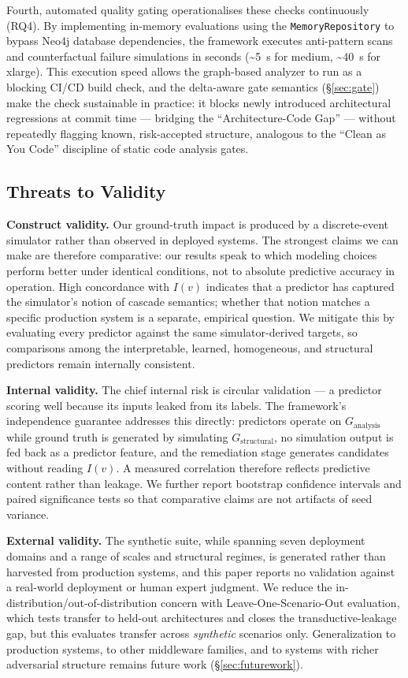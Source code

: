 \documentclass[review]{elsarticle}
\begin{document}
Fourth, automated quality gating operationalises these checks continuously (RQ4). By implementing
in-memory evaluations using the \texttt{MemoryRepository} to bypass Neo4j database dependencies, the
framework executes anti-pattern scans and counterfactual failure simulations in seconds (\textasciitilde5~s
for medium, \textasciitilde40~s for xlarge). This execution speed allows the graph-based analyzer to
run as a blocking CI/CD build check, and the delta-aware gate semantics (\S\ref{sec:gate}) make the
check sustainable in practice: it blocks newly introduced architectural regressions at commit time
--- bridging the ``Architecture-Code Gap'' --- without repeatedly flagging known, risk-accepted
structure, analogous to the ``Clean as You Code'' discipline of static code analysis gates.

\subsection{Threats to Validity}

\textbf{Construct validity.} Our ground-truth impact is produced by a discrete-event simulator
rather than observed in deployed systems. The strongest claims we can make are therefore
comparative: our results speak to which modeling choices perform better under identical conditions,
not to absolute predictive accuracy in operation. High concordance with $I(v)$ indicates that a
predictor has captured the simulator's notion of cascade semantics; whether that notion matches a
specific production system is a separate, empirical question. We mitigate this by evaluating every
predictor against the same simulator-derived targets, so comparisons among the interpretable,
learned, homogeneous, and structural predictors remain internally consistent.

\textbf{Internal validity.} The chief internal risk is circular validation --- a predictor scoring
well because its inputs leaked from its labels. The framework's independence guarantee addresses
this directly: predictors operate on $G_{\text{analysis}}$ while ground truth is generated by
simulating $G_{\text{structural}}$, no simulation output is fed back as a predictor feature, and the
remediation stage generates candidates without reading $I(v)$. A measured correlation therefore
reflects predictive content rather than leakage. We further report bootstrap confidence intervals and
paired significance tests so that comparative claims are not artifacts of seed variance.

\textbf{External validity.} The synthetic suite, while spanning seven deployment domains and a range
of scales and structural regimes, is generated rather than harvested from production systems, and
this paper reports no validation against a real-world deployment or human expert judgment. We reduce
the in-distribution/out-of-distribution concern with Leave-One-Scenario-Out evaluation, which tests
transfer to held-out architectures and closes the transductive-leakage gap, but this evaluates
transfer across \emph{synthetic} scenarios only. Generalization to production systems, to other
middleware families, and to systems with richer adversarial structure remains future work
(\S\ref{sec:futurework}).
\end{document}
